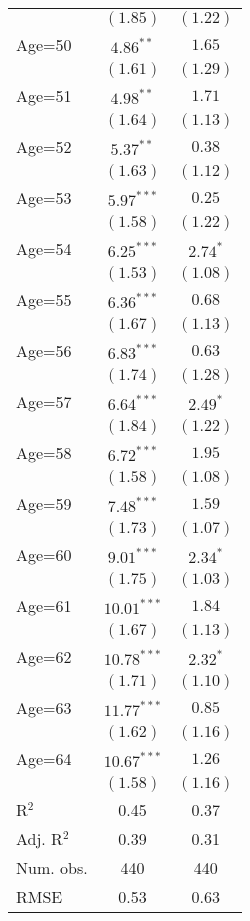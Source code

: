 \documentclass[fullpage]{paper}
\begin{document}
\begin{center}
\begin{longtable}{l c c }
            & $(1.85)$      & $(1.22)$      \\
Age=50      & $4.86^{**}$   & $1.65$        \\
            & $(1.61)$      & $(1.29)$      \\
Age=51      & $4.98^{**}$   & $1.71$        \\
            & $(1.64)$      & $(1.13)$      \\
Age=52      & $5.37^{**}$   & $0.38$        \\
            & $(1.63)$      & $(1.12)$      \\
Age=53      & $5.97^{***}$  & $0.25$        \\
            & $(1.58)$      & $(1.22)$      \\
Age=54      & $6.25^{***}$  & $2.74^{*}$    \\
            & $(1.53)$      & $(1.08)$      \\
Age=55      & $6.36^{***}$  & $0.68$        \\
            & $(1.67)$      & $(1.13)$      \\
Age=56      & $6.83^{***}$  & $0.63$        \\
            & $(1.74)$      & $(1.28)$      \\
Age=57      & $6.64^{***}$  & $2.49^{*}$    \\
            & $(1.84)$      & $(1.22)$      \\
Age=58      & $6.72^{***}$  & $1.95$        \\
            & $(1.58)$      & $(1.08)$      \\
Age=59      & $7.48^{***}$  & $1.59$        \\
            & $(1.73)$      & $(1.07)$      \\
Age=60      & $9.01^{***}$  & $2.34^{*}$    \\
            & $(1.75)$      & $(1.03)$      \\
Age=61      & $10.01^{***}$ & $1.84$        \\
            & $(1.67)$      & $(1.13)$      \\
Age=62      & $10.78^{***}$ & $2.32^{*}$    \\
            & $(1.71)$      & $(1.10)$      \\
Age=63      & $11.77^{***}$ & $0.85$        \\
            & $(1.62)$      & $(1.16)$      \\
Age=64      & $10.67^{***}$ & $1.26$        \\
            & $(1.58)$      & $(1.16)$      \\
\hline
R$^2$       & 0.45          & 0.37          \\
Adj. R$^2$  & 0.39          & 0.31          \\
Num. obs.   & 440           & 440           \\
RMSE        & 0.53          & 0.63          \\
\end{longtable}
\end{center}
\end{document}

